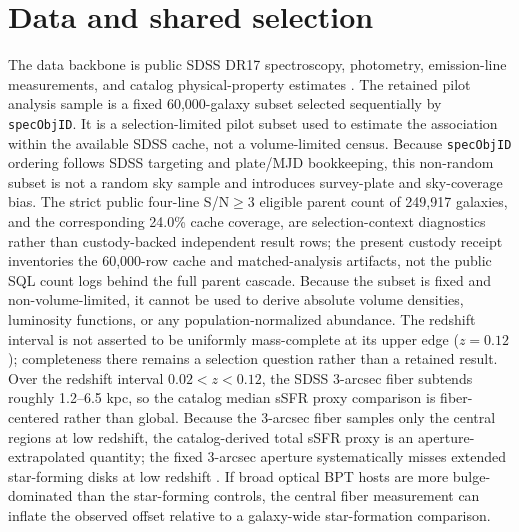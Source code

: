 \documentclass[twocolumn]{aastex631}
\begin{document}
\section{Data and shared selection}
The data backbone is public SDSS DR17 spectroscopy, photometry, emission-line measurements, and catalog physical-property estimates \citep{york2000,sdssdr17,brinchmann2004}. The retained pilot analysis sample is a fixed 60,000-galaxy subset selected sequentially by \texttt{specObjID}. It is a selection-limited pilot subset used to estimate the association within the available SDSS cache, not a volume-limited census. Because \texttt{specObjID} ordering follows SDSS targeting and plate/MJD bookkeeping, this non-random subset is not a random sky sample and introduces survey-plate and sky-coverage bias. The strict public four-line S/N$\geq3$ eligible parent count of 249,917 galaxies, and the corresponding 24.0\% cache coverage, are selection-context diagnostics rather than custody-backed independent result rows; the present custody receipt inventories the 60,000-row cache and matched-analysis artifacts, not the public SQL count logs behind the full parent cascade. Because the subset is fixed and non-volume-limited, it cannot be used to derive absolute volume densities, luminosity functions, or any population-normalized abundance. The redshift interval is not asserted to be uniformly mass-complete at its upper edge ($z=0.12$); completeness there remains a selection question rather than a retained result.
Over the redshift interval $0.02<z<0.12$, the SDSS 3-arcsec fiber subtends roughly 1.2--6.5 kpc, so the catalog median sSFR proxy comparison is fiber-centered rather than global.
Because the 3-arcsec fiber samples only the central regions at low redshift, the catalog-derived total sSFR proxy is an aperture-extrapolated quantity; the fixed 3-arcsec aperture systematically misses extended star-forming disks at low redshift \citep{kewley2005}. If broad optical BPT hosts are more bulge-dominated than the star-forming controls, the central fiber measurement can inflate the observed offset relative to a galaxy-wide star-formation comparison.
\end{document}

